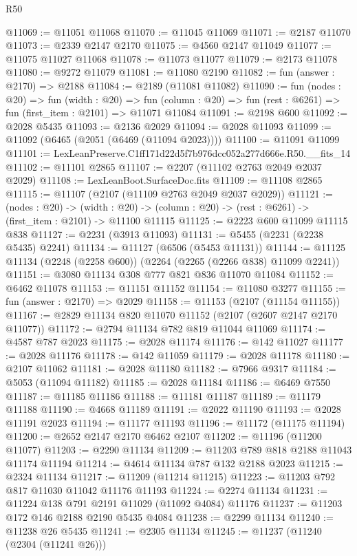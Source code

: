 \begin{lexlean}{R50}
\begin{coremodule}
@11069 := @11051 @11068
@11070 := @11045 @11069
@11071 := @2187 @11070
@11073 := @2339 @2147 @2170
@11075 := @4560 @2147 @11049
@11077 := @11075 @11027 @11068
@11078 := @11073 @11077
@11079 := @2173 @11078
@11080 := @9272 @11079
@11081 := @11080 @2190
@11082 := fun (answer : @2170) => @2188
@11084 := @2189 (@11081 @11082)
@11090 := fun (nodes : @20) =>
  fun (width : @20) =>
  fun (column : @20) => fun (rest : @6261) => fun (first_item : @2101) => @11071 @11084
@11091 := @2198 @600
@11092 := @2028 @5435
@11093 := @2136 @2029
@11094 := @2028 @11093
@11099 := @11092 (@6465 (@2051 (@6469 (@11094 @2023))))
@11100 := @11091 @11099
@11101 := LexLeanPreserve.C1ff171d22d5f7b976dcc052a277d666e.R50.__fits_14
@11102 := @11101 @2865
@11107 := @2207 (@11102 @2763 @2049 @2037 @2029)
@11108 := LexLeanBoot.SurfaceDoc.fits
@11109 := @11108 @2865
@11115 := @11107 (@2107 (@11109 @2763 @2049 @2037 @2029))
@11121 := (nodes : @20) ->
  (width : @20) -> (column : @20) -> (rest : @6261) -> (first_item : @2101) -> @11100 @11115
@11125 := @2223 @600 @11099 @11115 @838
@11127 := @2231 (@3913 @11093)
@11131 := @5455 (@2231 (@2238 @5435) @2241)
@11134 := @11127 (@6506 (@5453 @11131))
@11144 := @11125 @11134 (@2248 (@2258 @600)) (@2264 (@2265 (@2266 @838) @11099 @2241))
@11151 := @3080 @11134 @308 @777 @821 @836 @11070 @11084
@11152 := @6462 @11078
@11153 := @11151 @11152
@11154 := @11080 @3277
@11155 := fun (answer : @2170) => @2029
@11158 := @11153 (@2107 (@11154 @11155))
@11167 := @2829 @11134 @820 @11070 @11152 (@2107 (@2607 @2147 @2170 @11077))
@11172 := @2794 @11134 @782 @819 @11044 @11069
@11174 := @4587 @787 @2023
@11175 := @2028 @11174
@11176 := @142 @11027
@11177 := @2028 @11176
@11178 := @142 @11059
@11179 := @2028 @11178
@11180 := @2107 @11062
@11181 := @2028 @11180
@11182 := @7966 @9317
@11184 := @5053 (@11094 @11182)
@11185 := @2028 @11184
@11186 := @6469 @7550
@11187 := @11185 @11186
@11188 := @11181 @11187
@11189 := @11179 @11188
@11190 := @4668 @11189
@11191 := @2022 @11190
@11193 := @2028 @11191 @2023
@11194 := @11177 @11193
@11196 := @11172 (@11175 @11194)
@11200 := @2652 @2147 @2170 @6462 @2107
@11202 := @11196 (@11200 @11077)
@11203 := @2290 @11134
@11209 := @11203 @789 @818 @2188 @11043 @11174 @11194
@11214 := @4614 @11134 @787 @132 @2188 @2023
@11215 := @2324 @11134
@11217 := @11209 (@11214 @11215)
@11223 := @11203 @792 @817 @11030 @11042 @11176 @11193
@11224 := @2274 @11134
@11231 := @11224 @138 @791 @2191 @11029 (@11092 @4084) @11176
@11237 := @11203 @172 @146 @2188 @2190 @5435 @4084
@11238 := @2299 @11134
@11240 := @11238 @26 @5435
@11241 := @2305 @11134
@11245 := @11237 (@11240 (@2304 (@11241 @26)))

\end{coremodule}
\end{lexlean}
